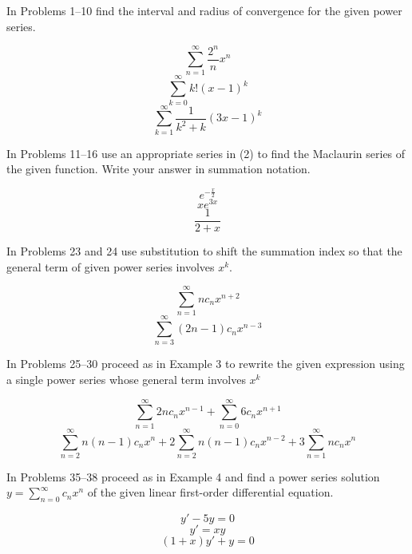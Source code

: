 \documentclass[12pt]{report}
\begin{document}
In Problems 1--10 find the interval and radius of convergence for the given power series.
\begin{enumerate}[label=\arabic*., start=3]
	\problem \[ \sum_{n=1}^{\infty} \frac{2^{n}}{n}x^{n}  \] %
	\setcounter{enumi}{5}
	\problem \[ \sum_{k=0}^{\infty} k!(x-1)^{k} \] %
	\problem \[ \sum_{k=1}^{\infty} \frac{1}{k^{2} + k}(3x - 1)^{k}  \] %
\end{enumerate}

In Problems 11--16 use an appropriate series in (2) to find the Maclaurin series of the given function. Write your answer in summation notation.
\begin{enumerate}[label=\arabic*., start=11]
	\problem \[ e^{-\frac{x}{2}} \] %
	\problem \[ xe^{3x} \] %
	\problem \[ \frac{1}{2 + x} \] %
\end{enumerate}

In Problems 23 and 24 use substitution to shift the summation index so that the general term of given power series involves $x^{k}$.
\begin{enumerate}[label=\arabic*., start=23]
	\problem \[ \sum_{n=1}^{\infty} nc_{n}x^{n+2}  \] %
	\problem \[ \sum_{n=3}^{\infty} (2n-1)c_{n}x^{n-3}  \] %
\end{enumerate}

In Problems 25--30 proceed as in Example 3 to rewrite the given expression using a single power series whose general term involves $x^{k}$
\begin{enumerate}[label=\arabic*., start=27]
	\problem \[ \sum_{n=1}^{\infty} 2nc_{n}x^{n-1} + \sum_{n=0}^{\infty} 6c_{n}x^{n+1}   \] %
	\setcounter{enumi}{29}
	\problem \[ \sum_{n=2}^{\infty} n(n-1)c_{n}x^{n} + 2 \sum_{n=2}^{\infty} n(n-1)c_{n}x^{n-2} + 3 \sum_{n=1}^{\infty} nc_{n}x^{n} \] %
\end{enumerate}

In Problems 35--38 proceed as in Example 4 and find a power series solution $y = \sum_{n=0}^{\infty} c_{n}x^{n} $ of the given linear first-order differential equation.
\begin{enumerate}[label=\arabic*., start=35]
	\problem \[ y' - 5y = 0 \] %
	\setcounter{enumi}{36}
	\problem \[ y' = xy \] %
	\problem \[ (1+x)y' + y = 0 \] %
\end{enumerate}
\end{document}
